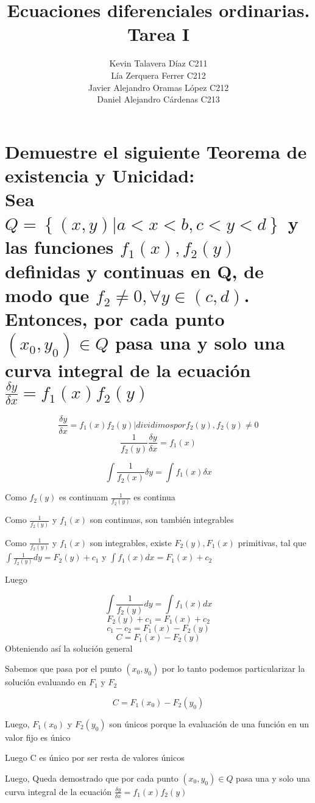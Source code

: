 \documentclass{article}
\title{Ecuaciones diferenciales ordinarias. Tarea I}
\author{
    Kevin Talavera Díaz C211\\
    Lía Zerquera Ferrer C212\\
    Javier Alejandro Oramas López C212\\
    Daniel Alejandro Cárdenas C213\\
    }
\date{}
\begin{document}
    \maketitle

    \section{Demuestre el siguiente Teorema de existencia y Unicidad:\\
        Sea $Q = \left\{ (x,y) | a < x < b, c < y < d \right\}$ y las funciones $f_{1}(x),f_{2}(y)$ definidas y continuas en Q, 
        de modo que $f_2 \not= 0, \forall y \in (c,d)$. Entonces, por cada punto $ (x_0, y_0) \in Q $ pasa una y solo una curva 
        integral de la ecuación $\frac{\delta y}{\delta x} = f_{1}(x)f_{2}(y)$}

        \[\frac{\delta y}{\delta x} = f_1(x)f_2(y) | dividimos por f_2(y), f_2(y) \not = 0  \]
        \[\frac{1}{f_2(y)}\frac{\delta y}{\delta x} = f_1(x)\]

        \[\int \frac{1}{f_2(x)} \delta y = \int f_1(x) \delta x\]
        
        Como $f_2(y)$ es continuam $\frac{1}{f_2(y)}$ es continua
        
        Como $\frac{1}{f_2(y)}$ y $f_1(x)$ son continuas, son también integrables

        Como $\frac{1}{f_2(y)}$ y $f_1(x)$ son integrables, existe $F_2(y), F_1(x)$ primitivas, 
        tal que $ \int \frac{1}{f_2(y)} dy = F_2(y) + c_1$ y $ \int f_1(x) dx =  F_1(x) +c_2$ 

        Luego

        \[\int \frac{1}{f_2(y)} dy = \int f_1(x) dx \]
        \[F_2(y) + c_1 = F_1(x) + c_2\]
        \[c_1 - c_2 = F_1(x) - F_2(y) \]
        \[ C = F_1(x) - F_2(y) \]
        Obteniendo así la solución general

        Sabemos que pasa por el punto $(x_0, y_0)$ por lo tanto podemos particularizar la 
        solución evaluando en $F_1$ y $F_2$

        \[C = F_1(x_0)-F_2(y_0)\]

        Luego, $F_1(x_0)$ y $F_2(y_0)$ son únicos porque la evaluación de una función en un valor fijo es único

        Luego C es único por ser resta de valores únicos

        Luego, Queda demostrado que por cada punto $ (x_0, y_0) \in Q $ pasa una y solo una curva 
        integral de la ecuación $\frac{\delta y}{\delta x} = f_{1}(x)f_{2}(y)$
\end{document}
